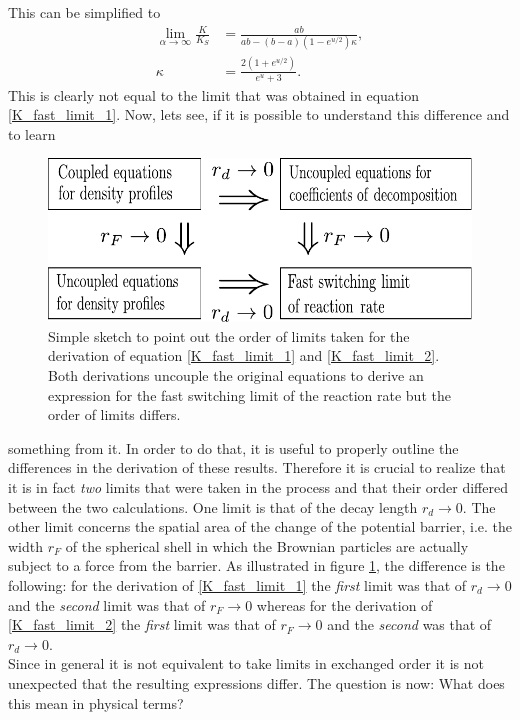 This can be simplified to 
\begin{align}
    \lim_{\alpha \rightarrow \infty} \frac{K}{K_S} &= \frac{ab}{ab - (b-a)(1-e^{u/2}) \kappa}, \\
    \kappa &= \frac{2(1+e^{u/2})}{e^u + 3}.
    \label{K_fast_limit_2}
\end{align}
This is clearly not equal to the limit that was obtained in equation \eqref{K_fast_limit_1}.
Now, lets see, if it is possible to understand this difference and to learn  \par 
\begin{figure}
    \vspace{-0.2 cm}
    \includegraphics[width = 1 \textwidth]{plots/limits.pdf}
    \caption{Simple sketch to point out the order of limits taken for the derivation of equation \eqref{K_fast_limit_1} and \eqref{K_fast_limit_2}. Both derivations uncouple the original equations to derive an expression for the fast switching limit of the reaction rate but the order of limits differs.}
    \label{sketch_of_limits}
\end{figure}
something from it. In order to do that, it is useful to properly outline the differences in the derivation of these results. Therefore it is crucial to realize that it is in fact \emph{two} limits that were taken in the process and that their order differed between the two calculations. One limit is that of the decay length $r_d \rightarrow 0$. The other limit concerns the spatial area of the change of the potential barrier, i.e. the width $r_F$ of the spherical shell in which the Brownian particles are actually subject to a force from the barrier.
As illustrated in figure \ref{sketch_of_limits}, the difference is the following: for the derivation of \eqref{K_fast_limit_1} the \emph{first} limit was that of $r_d \rightarrow 0$ and the \emph{second} limit was that of $r_F \rightarrow 0$ whereas for the derivation of \eqref{K_fast_limit_2} the \emph{first} limit was that of $r_F \rightarrow 0$ and the \emph{second} was that of $r_d \rightarrow 0$. \\
Since in general it is not equivalent to take limits in exchanged order it is not unexpected that the resulting expressions differ. The question is now: What does this mean in physical terms? \\

